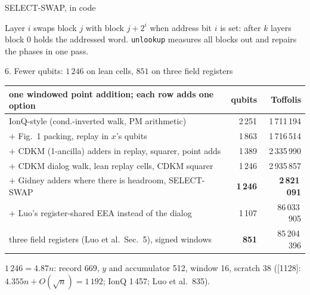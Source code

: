 \documentclass[aspectratio=169,11pt]{beamer}
\newcommand{\code}[2][]{}
\begin{document}
\setcounter{framenumber}{182}
\begin{frame}[fragile]{SELECT-SWAP, in code}
  \code[basicstyle=\ttfamily\footnotesize]{select_swap.py}
  \vskip2mm
  Layer $i$ swaps block $j$ with block $j+2^i$ when address bit $i$ is set: after $k$ layers block 0 holds the addressed word. \texttt{unlookup} measures all blocks out and repairs the phases in one pass.
\end{frame}

\setcounter{framenumber}{183}
\begin{frame}{6. Fewer qubits: $1\,246$ on lean cells, $851$ on three field registers}
  \centering\small
  \renewcommand{\arraystretch}{1.15}
  \begin{tabular}{@{}lrr@{}}
    \toprule
    one windowed point addition; each row adds one option & qubits & Toffolis \\
    \midrule
    IonQ-style (cond.-inverted walk, PM arithmetic) & 2\,251 & 1\,711\,194 \\
    $+$ Fig.~1 packing, replay in $x$'s qubits & 1\,863 & 1\,716\,514 \\
    $+$ CDKM (1-ancilla) adders in replay, squarer, point adds & 1\,389 & 2\,335\,990 \\
    $+$ CDKM dialog walk, lean replay cells, CDKM squarer & 1\,246 & 2\,935\,857 \\
    $+$ Gidney adders where there is headroom, SELECT-SWAP & \textbf{1\,246} & \textbf{2\,821\,091} \\
    $+$ Luo's register-shared EEA instead of the dialog & 1\,107 & 86\,033\,905 \\
    three field registers (Luo et al.\ Sec.~5), signed windows & \textbf{851} & 85\,204\,396 \\
    \bottomrule
  \end{tabular}
  \vskip2mm
  \raggedright{\small $1\,246=4.87n$: record 669, $y$ and accumulator 512, window 16, scratch 38 ([1128]: $4.355n+O(\sqrt n)=1\,192$; IonQ 1\,457; Luo et al.\ 835).}
\end{frame}
\end{document}
